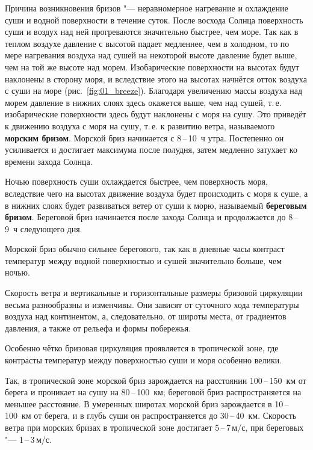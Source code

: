 \documentclass[a4paper, 12pt, twoside, final, book, russian, fittopage, cyremdash, openright]{ncc}
\newcommand{\mps}{\,м/с\xspace}
\newcommand{\otdo}{\,--\,}
\begin{document}
Причина возникновения бризов "--- неравномерное нагревание и
охлаждение суши и водной поверхности в течение суток. После восхода
Солнца поверхность суши и воздух над ней прогреваются значительно
быстрее, чем море. Так как в теплом воздухе давление с высотой падает
медленнее, чем в холодном, то по мере нагревания воздуха над сушей на
некоторой высоте давление будет выше, чем на той же высоте над
морем. Изобарические поверхности на высотах будут наклонены в сторону
моря, и вследствие этого на высотах начнётся отток воздуха с суши на
море (рис.~\ref{fig:01_breeze}). Благодаря увеличению массы воздуха
над морем давление в нижних слоях здесь окажется выше, чем над сушей,
т.\,е. изобарические поверхности здесь будут наклонены с моря на
сушу. Это приведёт к движению воздуха с моря на сушу, т.\,е. к развитию
ветра, называемого \textbf{морским
  бризом}. Морской бриз начинается с 8\otdo10~ч
утра. Постепенно он усиливается и достигает максимума после полудня,
затем медленно затухает ко времени захода Солнца.

Ночью поверхность суши охлаждается быстрее, чем поверхность моря,
вследствие чего на высотах движение воздуха будет происходить с моря к
суше, а в нижних слоях будет развиваться ветер от суши к морю,
называемый \textbf{береговым бризом}. Береговой
бриз начинается после захода Солнца и продолжается до 8\otdo9~ч
следующего дня.

Морской бриз обычно сильнее берегового, так как в дневные часы
контраст температур между водной поверхностью и сушей значительно
больше, чем ночью.

Скорость ветра и вертикальные и горизонтальные размеры бризовой
циркуляции весьма разнообразны и изменчивы. Они зависят от суточного
хода температуры воздуха над континентом, а, следовательно, от широты
места, от градиентов давления, а также от рельефа и формы побережья.

Особенно чётко бризовая циркуляция проявляется в тропической зоне, где
контрасты температур между поверхностью суши и моря особенно велики.

Так, в тропической зоне морской бриз зарождается на расстоянии
100\otdo150~км от берега и проникает на сушу на 80\otdo100~км; береговой
бриз распространяется на меньшее расстояние. В умеренных широтах
морской бриз зарождается в 10\otdo100~км от берега, и в глубь суши он
распространяется до 30\otdo40~км. Скорость ветра при морских бризах в
тропической зоне достигает 5\otdo7\mps, при береговых "--- 1\otdo3\mps.
\end{document}

